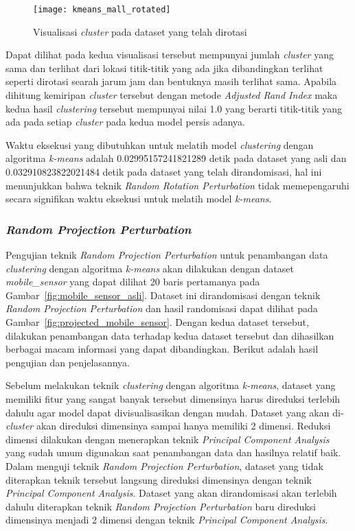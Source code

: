 \begin{figure}
	\centering
	\texttt{[image: kmeans\_mall\_rotated]}
	\caption{Visualisasi \textit{cluster} pada dataset yang telah dirotasi}
	\label{fig:kmeans_mall_rotated}
\end{figure}

Dapat dilihat pada kedua visualisasi tersebut mempunyai jumlah \textit{cluster} yang sama dan terlihat dari lokasi titik-titik yang ada jika dibandingkan terlihat seperti dirotasi searah jarum jam dan bentuknya masih terlihat sama. Apabila dihitung kemiripan \textit{cluster} tersebut dengan metode \textit{Adjusted Rand Index} maka kedua hasil \textit{clustering} tersebut mempunyai nilai 1.0 yang berarti titik-titik yang ada pada setiap \textit{cluster} pada kedua model persis adanya.
	
Waktu eksekusi yang dibutuhkan untuk melatih model \textit{clustering} dengan algoritma \textit{k-means} adalah 0.02995157241821289 detik pada dataset yang asli dan 0.032910823822021484 detik pada dataset yang telah dirandomisasi, hal ini menunjukkan bahwa teknik \textit{Random Rotation Perturbation} tidak memepengaruhi secara signifikan waktu eksekusi untuk melatih model \textit{k-means}.

\subsubsection{\textit{Random Projection Perturbation}}
\label{subsubsec:pengujian-clustering-rpp}

Pengujian teknik \textit{Random Projection Perturbation} untuk penambangan data \textit{clustering} dengan algoritma \textit{k-means} akan dilakukan dengan dataset \textit{mobile\_sensor} yang dapat dilihat 20 baris pertamanya pada Gambar~\ref{fig:mobile_sensor_asli}. Dataset ini dirandomisasi dengan teknik \textit{Random Projection Perturbation} dan hasil randomisasi dapat dilihat pada Gambar~\ref{fig:projected_mobile_sensor}. Dengan kedua dataset tersebut, dilakukan penambangan data terhadap kedua dataset tersebut dan dihasilkan berbagai macam informasi yang dapat dibandingkan. Berikut adalah hasil pengujian dan penjelasannya.

Sebelum melakukan teknik \textit{clustering} dengan algoritma \textit{k-means}, dataset yang memiliki fitur yang sangat banyak tersebut dimensinya harus direduksi terlebih dahulu agar model dapat divisualisasikan dengan mudah. Dataset yang akan di-\textit{cluster} akan direduksi dimensinya sampai hanya memiliki 2 dimensi. Reduksi dimensi dilakukan dengan menerapkan teknik \textit{Principal Component Analysis} yang sudah umum digunakan saat penambangan data dan hasilnya relatif baik. Dalam menguji teknik \textit{Random Projection Perturbation}, dataset yang tidak diterapkan teknik tersebut langsung direduksi dimensinya dengan teknik \textit{Principal Component Analysis}. Dataset yang akan dirandomisasi akan terlebih dahulu diterapkan teknik \textit{Random Projection Perturbation} baru direduksi dimensinya menjadi 2 dimensi dengan teknik \textit{Principal Component Analysis}.

